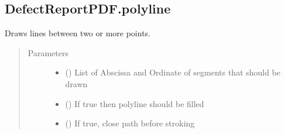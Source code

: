 \documentclass[letterpaper,10pt,english]{sphinxmanual}
\begin{document}
\begin{fulllineitems}
\begin{fulllineitems}
\begin{quote}
\begin{description}
\end{description}\end{quote}

\end{fulllineitems}



\subsection{DefectReportPDF.polyline}
\label{\detokenize{generated/quality_assessment.quality_pdf_report.DefectReportPDF.polyline:defectreportpdf-polyline}}\label{\detokenize{generated/quality_assessment.quality_pdf_report.DefectReportPDF.polyline::doc}}

\begin{fulllineitems}
\label{\detokenize{generated/quality_assessment.quality_pdf_report.DefectReportPDF.polyline:quality_assessment.quality_pdf_report.DefectReportPDF.polyline}}
\sphinxAtStartPar
Draws lines between two or more points.
\begin{quote}\begin{description}
\item[{Parameters}] \leavevmode\begin{itemize}
\item {} 
\sphinxAtStartPar
{} () \textendash{} List of Abscissa and Ordinate of
segments that should be drawn

\item {} 
\sphinxAtStartPar
{} () \textendash{} If true then polyline should be filled

\item {} 
\sphinxAtStartPar
{} () \textendash{} If true, close path before stroking

\end{itemize}


\end{description}
\end{quote}
\end{fulllineitems}
\end{fulllineitems}
\end{document}
